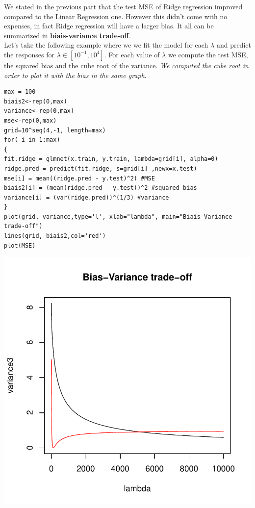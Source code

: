 \documentclass[]{report}
\begin{document}
We stated in the previous part that the test MSE of Ridge regression improved compared to the Linear Regression one.
However this didn't  come with no expenses, in fact Ridge regression will have a larger bias. It all can be summarized in\textbf{ biais-variance trade-off}.\\ 

Let's take the following example where we we fit the model for each $\lambda$ and predict the responses for $\lambda\in[10^{-1},10^{4}]$. For each value of $\lambda$ we compute the test MSE, the squared bias and the cube root of the variance. \textit{We computed the cube root in order to plot it with the bias in the same graph}.
\begin{lstlisting}
max = 100
biais2<-rep(0,max)
variance<-rep(0,max) 
mse<-rep(0,max)
grid=10^seq(4,-1, length=max)
for( i in 1:max)
{     
fit.ridge = glmnet(x.train, y.train, lambda=grid[i], alpha=0)
ridge.pred = predict(fit.ridge, s=grid[i] ,newx=x.test)
mse[i] = mean((ridge.pred - y.test)^2) #MSE
biais2[i] = (mean(ridge.pred - y.test))^2 #squared bias
variance[i] = (var(ridge.pred))^(1/3) #variance
}
plot(grid, variance,type='l', xlab="lambda", main="Biais-Variance trade-off")
lines(grid, biais2,col='red')
plot(MSE)
\end{lstlisting}

\begin{center}
	\includegraphics[width=0.8\linewidth]{Figures/ridge_bias_var.pdf}
\end{center}
\end{document}
